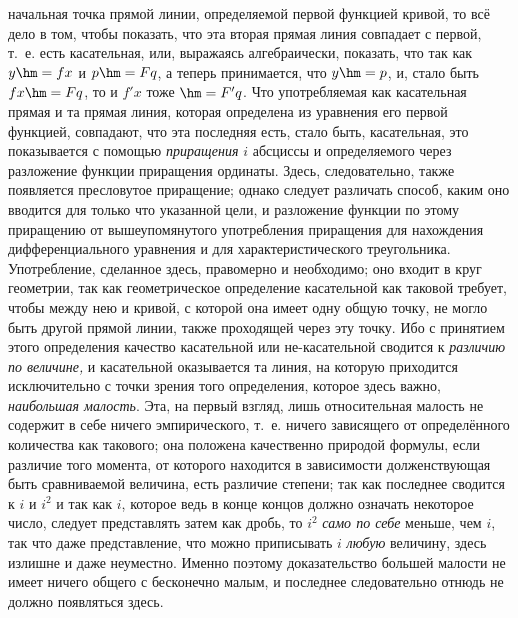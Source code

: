 начальная точка прямой линии, определяемой первой функцией кривой, то всё дело
в том, чтобы показать, что эта вторая прямая линия совпадает с первой, т.~е.
есть касательная, или, выражаясь алгебраически, показать, что так как $y\hm=fx$
и $p\hm=Fq$, а теперь принимается, что $y\hm=p$, и, стало быть $fx\hm=Fq$, то и
$f'x$ тоже $\hm=F'q$. Что употребляемая как касательная прямая и та прямая
линия, которая определена из уравнения его первой функцией, совпадают, что эта
последняя есть, стало быть, касательная, это показывается с помощью
{\em приращения} $i$ абсциссы и определяемого через разложение функции
приращения ординаты. Здесь, следовательно, также появляется пресловутое
приращение; однако следует различать способ, каким оно вводится для только что
указанной цели, и разложение функции по этому приращению от вышеупомянутого
употребления приращения для нахождения дифференциального уравнения и для
характеристического треугольника. Употребление, сделанное здесь, правомерно и
необходимо; оно входит в круг геометрии, так как геометрическое определение
касательной как таковой требует, чтобы между нею и кривой, с которой она имеет
одну общую точку, не могло быть другой прямой линии, также проходящей через эту
точку. Ибо с принятием этого определения качество касательной или
не-касательной сводится к {\em различию по величине,} и касательной оказывается
та линия, на которую приходится исключительно с точки зрения того определения,
которое здесь важно, {\em наибольшая малость}. Эта, на первый взгляд, лишь
относительная малость не содержит в себе ничего эмпирического, т.~е. ничего
зависящего от определённого количества как такового; она положена качественно
природой формулы, если различие того момента, от которого находится в
зависимости долженствующая быть сравниваемой величина, есть различие степени;
так как последнее сводится к $i$ и $i^{2}$ и так как $i$, которое ведь в конце
концов должно означать некоторое число, следует представлять затем как дробь,
то $i^2$ {\em само по себе} меньше, чем $i$, так что даже представление, что
можно приписывать $i$ {\em любую} величину, здесь излишне и даже неуместно.
Именно поэтому доказательство большей малости не имеет ничего общего с
бесконечно малым, и последнее следовательно отнюдь не должно появляться здесь.

